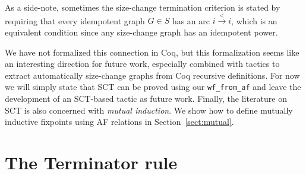 \documentclass{llncs}
\begin{document}
As a side-note, sometimes the size-change termination criterion is stated by requiring that 
every idempotent graph $G \in S$ has an arc $i \stackrel{<}{\longrightarrow} i$, which is an equivalent 
condition since any size-change graph has an idempotent power. 

We have not formalized this connection in Coq, but this formalization seems like an interesting
direction for future work, especially combined with tactics to extract automatically 
size-change graphs from Coq recursive definitions. For now we will simply state that SCT 
can be proved using our \lstinline|wf_from_af| and leave the development of an SCT-based 
tactic as future work. Finally, the literature on SCT is also concerned 
with {\em mutual induction}. We show how to define mutually inductive fixpoints using AF 
relations in Section~\ref{sect:mutual}.


\section{The Terminator rule}\label{sect:terminator}
\end{document}
